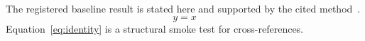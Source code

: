 \documentclass{article}
\begin{document}
The registered baseline result is stated here and supported by the cited method~\cite{smith2026}.
\begin{equation}
  y = x
  \label{eq:identity}
\end{equation}
Equation~\ref{eq:identity} is a structural smoke test for cross-references.


\end{document}
